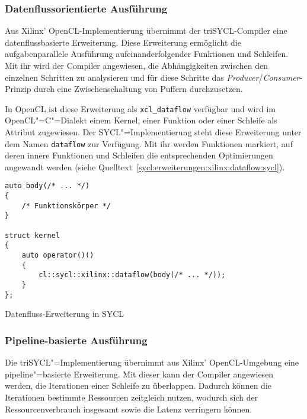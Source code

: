\subsubsection{Datenflussorientierte Ausführung}
\label{sycl:erweiterungen:xilinx:dataflow}

Aus Xilinx' OpenCL-Implementierung übernimmt der triSYCL-Compiler eine
datenflussbasierte Erweiterung. Diese Erweiterung ermöglicht die
aufgabenparallele Ausführung aufeinanderfolgender Funktionen und Schleifen. Mit
ihr wird der Compiler angewiesen, die Abhängigkeiten zwischen den einzelnen
Schritten zu analysieren und für diese Schritte das
\textit{Producer}/\textit{Consumer}-Prinzip durch eine Zwischenschaltung von
Puffern durchzusetzen. \cite[siehe][70\psqq]{sdaccelopt2019}

In OpenCL ist diese Erweiterung als \texttt{xcl\_dataflow} verfügbar und wird
im OpenCL"=C"=Dialekt einem Kernel, einer Funktion oder einer Schleife als
Attribut zugewiesen. Der SYCL"=Implementierung steht diese Erweiterung unter dem
Namen \texttt{dataflow} zur Verfügung. Mit ihr werden Funktionen markiert, auf
deren innere Funktionen und Schleifen die entsprechenden Optimierungen angewandt
werden (siehe Quelltext~\ref{sycl:erweiterungen:xilinx:dataflow:sycl}).

\begin{code}
    \begin{verbatim}
auto body(/* ... */)
{
    /* Funktionskörper */
}

struct kernel
{
    auto operator()()
    {
        cl::sycl::xilinx::dataflow(body(/* ... */));
    }
};
    \end{verbatim}
    \caption{Datenfluss-Erweiterung in SYCL}
    \label{sycl:erweiterungen:xilinx:dataflow:sycl}
\end{code}

\subsubsection{Pipeline-basierte Ausführung}
\label{sycl:erweiterungen:xilinx:pipeline}

Die triSYCL"=Implementierung übernimmt aus Xilinx' OpenCL-Umgebung eine
pipeline"=basierte Erweiterung. Mit dieser kann der Compiler angewiesen werden,
die Iterationen einer Schleife zu überlappen. Dadurch können die Iterationen
bestimmte Ressourcen zeitgleich nutzen, wodurch sich der Ressourcenverbrauch
insgesamt sowie die Latenz verringern können.
\cite[siehe][67\psqq]{sdaccelopt2019}


